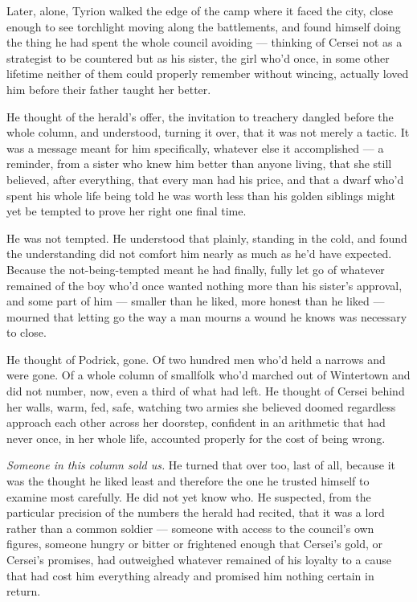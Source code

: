 \sceneBreak

Later, alone, Tyrion walked the edge of the camp where it faced the city, close enough to see torchlight moving along the battlements, and found himself doing the thing he had spent the whole council avoiding — thinking of Cersei not as a strategist to be countered but as his sister, the girl who’d once, in some other lifetime neither of them could properly remember without wincing, actually loved him before their father taught her better.

He thought of the herald’s offer, the invitation to treachery dangled before the whole column, and understood, turning it over, that it was not merely a tactic. It was a message meant for him specifically, whatever else it accomplished — a reminder, from a sister who knew him better than anyone living, that she still believed, after everything, that every man had his price, and that a dwarf who’d spent his whole life being told he was worth less than his golden siblings might yet be tempted to prove her right one final time.

He was not tempted. He understood that plainly, standing in the cold, and found the understanding did not comfort him nearly as much as he’d have expected. Because the not-being-tempted meant he had finally, fully let go of whatever remained of the boy who’d once wanted nothing more than his sister’s approval, and some part of him — smaller than he liked, more honest than he liked — mourned that letting go the way a man mourns a wound he knows was necessary to close.

He thought of Podrick, gone. Of two hundred men who’d held a narrows and were gone. Of a whole column of smallfolk who’d marched out of Wintertown and did not number, now, even a third of what had left. He thought of Cersei behind her walls, warm, fed, safe, watching two armies she believed doomed regardless approach each other across her doorstep, confident in an arithmetic that had never once, in her whole life, accounted properly for the cost of being wrong.

\textit{Someone in this column sold us.} He turned that over too, last of all, because it was the thought he liked least and therefore the one he trusted himself to examine most carefully. He did not yet know who. He suspected, from the particular precision of the numbers the herald had recited, that it was a lord rather than a common soldier — someone with access to the council’s own figures, someone hungry or bitter or frightened enough that Cersei’s gold, or Cersei’s promises, had outweighed whatever remained of his loyalty to a cause that had cost him everything already and promised him nothing certain in return.

